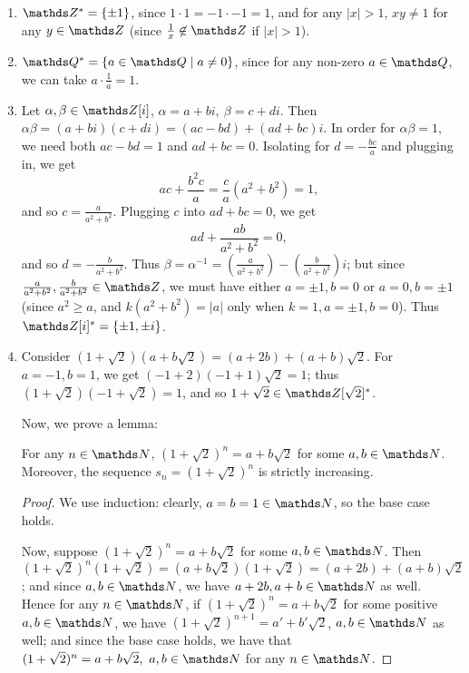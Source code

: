 \documentclass{homework}
\begin{document}
\begin{solution}
  \begin{enumerate}[label=(\alph*)]
    \item $\Z^*=\{\pm 1\}$, since $1\cdot 1=-1\cdot -1=1$, and for any $\left| x \right| >1$, $xy\neq
      1$ for any $y\in \Z$ (since $\frac{1}{x}\not\in \Z$ if $\left| x \right| >1$).
    \item $\Q^*=\{a\in \Q \mid a\neq 0\}$, since for any non-zero $a\in \Q$, we can take
      $a\cdot \frac{1}{a}=1$.
    \item Let $ \alpha,\beta\in \Z[i]$, $\alpha=a+bi,\ \beta=c+di$. Then
      $\alpha\beta=(a+bi)(c+di)=(ac-bd)+(ad+bc)i$. In order for $\alpha\beta=1$, we need both
      $ac-bd=1$ and $ad+bc=0$. Isolating for $d=-\frac{bc}{a}$ and plugging in, we get \[
        ac+\frac{b^2c}{a}=\frac{c}{a}(a^2+b^2)=1
      ,\] and so $c=\frac{a}{a^2+b^2}$. Plugging $c$ into $ad+bc=0$, we get \[
        ad+\frac{ab}{a^2+b^2}=0
      ,\] and so $d=-\frac{b}{a^2+b^2}$. Thus
      $\beta=\alpha^{-1}=(\frac{a}{a^2+b^2})-(\frac{b}{a^2+b^2})i$; but since $\frac{a}{a^2+b^2},
      \frac{b}{a^2+b^2}\in \Z$, we must have either $a=\pm 1,b=0$ or $a=0,b=\pm 1$ (since $a^2\ge
      a$, and $k(a^2+b^2)=\left| a \right|$ only when $k=1, a=\pm 1,b=0$). Thus $\Z[i]^*=\{ \pm
      1,\pm i \}$.

    \item Consider $(1+\sqrt{2})(a+b\sqrt{2})=(a+2b)+(a+b)\sqrt{2}$. For $a=-1,b=1$, we get
      $(-1+2)(-1+1)\sqrt{2}=1$; thus $(1+\sqrt{2})(-1+\sqrt{2})=1$, and so $1+\sqrt{2}\in
      \Z[\sqrt{2}]^*$.

      Now, we prove a lemma:
      \begin{lemma}[]{}
        For any $n\in \N$, $(1+\sqrt{2})^n=a+b\sqrt{2}$ for some $a,b\in \N$. Moreover, the sequence
        $s_n=(1+\sqrt{2})^n$ is strictly increasing.
      \end{lemma}
      \begin{proof}[Proof]
        We use induction: clearly, $a=b=1\in \N$, so the base case holds.

        Now, suppose $(1+\sqrt{2})^n=a+b\sqrt{2}$ for some $a,b\in \N$. Then
        $(1+\sqrt{2})^n(1+\sqrt{2})=(a+b\sqrt{2})(1+\sqrt{2})=(a+2b)+(a+b)\sqrt{2}$; and since
        $a,b\in \N$, we have $a+2b,a+b\in \N$ as well. Hence for any $n\in \N$, if
        $(1+\sqrt{2})^n=a+b\sqrt{2}$ for some positive $a,b\in \N$, we have
        $(1+\sqrt{2})^{n+1}=a'+b'\sqrt{2}$, $a,b\in \N$ as well; and since the base case holds, we
        have that $(1+\sqrt{2})^n=a+b\sqrt{2},\ a,b\in \N$ for any $n\in \N$.


\end{proof}
\end{enumerate}
\end{solution}
\end{document}

